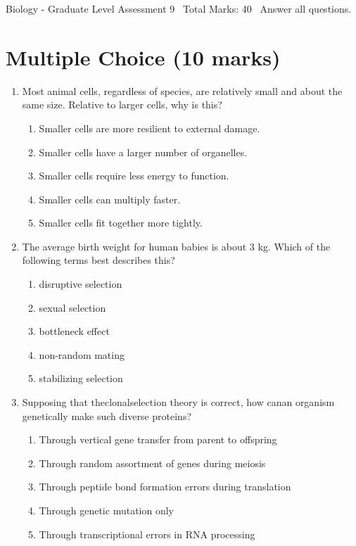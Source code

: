 \documentclass[12pt]{article}
\begin{document}
\begin{center}
Biology - Graduate Level Assessment 9 \
Total Marks: 40 \
Answer all questions.
\end{center}

\section*{Multiple Choice (10 marks)}
\begin{enumerate}[label=\arabic*.]
\item Most animal cells, regardless of species, are relatively small and about the same size. Relative to larger cells, why is this?
\begin{enumerate}[label=(\alph*)]
    \item Smaller cells are more resilient to external damage.
    \item Smaller cells have a larger number of organelles.
    \item Smaller cells require less energy to function.
    \item Smaller cells can multiply faster.
    \item Smaller cells fit together more tightly.
\end{enumerate}
\item The average birth weight for human babies is about 3 kg. Which of the following terms best describes this?
\begin{enumerate}[label=(\alph*)]
    \item disruptive selection
    \item sexual selection
    \item bottleneck effect
    \item non-random mating
    \item stabilizing selection
\end{enumerate}
\item Supposing that theclonalselection theory is correct, how canan organism genetically make such diverse proteins?
\begin{enumerate}[label=(\alph*)]
    \item Through vertical gene transfer from parent to offspring
    \item Through random assortment of genes during meiosis
    \item Through peptide bond formation errors during translation
    \item Through genetic mutation only
    \item Through transcriptional errors in RNA processing

\end{enumerate}
\end{enumerate}
\end{document}
